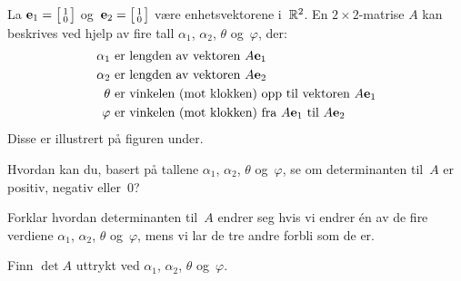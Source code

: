 \begin{oppgave}
La $\mathbf{e}_1 = \bigl[ \begin{smallmatrix} 1 \\ 0 \end{smallmatrix} \bigr]$
og~$\mathbf{e}_2 = \bigl[ \begin{smallmatrix} 1 \\ 0 \end{smallmatrix} \bigr]$
være enhetsvektorene i~$\mathbb{R}^2$.
En $2 \times 2$-matrise $A$ kan beskrives ved hjelp av fire tall
$\alpha_1$, $\alpha_2$, $\theta$ og~$\varphi$, der:
\begin{align*}
\alpha_1\ &\text{er lengden av vektoren $A \mathbf{e}_1$} \\
\alpha_2\ &\text{er lengden av vektoren $A \mathbf{e}_2$} \\
\theta  \ &\text{er vinkelen (mot klokken) opp til vektoren $A \mathbf{e}_1$} \\
\varphi \ &\text{er vinkelen (mot klokken) fra $A \mathbf{e}_1$ til $A \mathbf{e}_2$}
\end{align*}
Disse er illustrert på figuren under.
\begin{center}
\end{center}
\begin{punkt}
Hvordan kan du, basert på tallene $\alpha_1$, $\alpha_2$, $\theta$
og~$\varphi$, se om determinanten til~$A$ er positiv, negativ
eller~$0$?
\end{punkt}
\begin{punkt}
Forklar hvordan determinanten til~$A$ endrer seg hvis vi endrer én av
de fire verdiene $\alpha_1$, $\alpha_2$, $\theta$ og~$\varphi$, mens
vi lar de tre andre forbli som de er.
\end{punkt}
\begin{punkt}
Finn $\det A$ uttrykt ved $\alpha_1$, $\alpha_2$, $\theta$
og~$\varphi$.
\end{punkt}
\end{oppgave}


